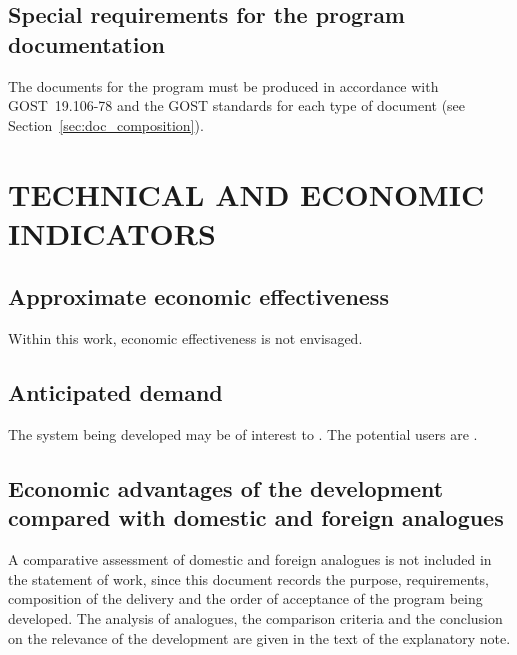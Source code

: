 \documentclass[12pt,a4paper]{extarticle}
\begin{document}
\subsection{Special requirements for the program documentation}
\label{sec:doc_reqs}

The documents for the program must be produced in accordance with GOST~19.106-78 and the GOST standards for each type of document (see Section~\ref{sec:doc_composition}).

\clearpage

\section{TECHNICAL AND ECONOMIC INDICATORS}

\subsection{Approximate economic effectiveness}

Within this work, economic effectiveness is not envisaged.

\subsection{Anticipated demand}

The system being developed may be of interest to . The potential users are .

\subsection{Economic advantages of the development compared with domestic and foreign analogues}

A comparative assessment of domestic and foreign analogues is not included in the statement of work, since this document records the purpose, requirements, composition of the delivery and the order of acceptance of the program being developed. The analysis of analogues, the comparison criteria and the conclusion on the relevance of the development are given in the text of the explanatory note.

\clearpage

\end{document}
